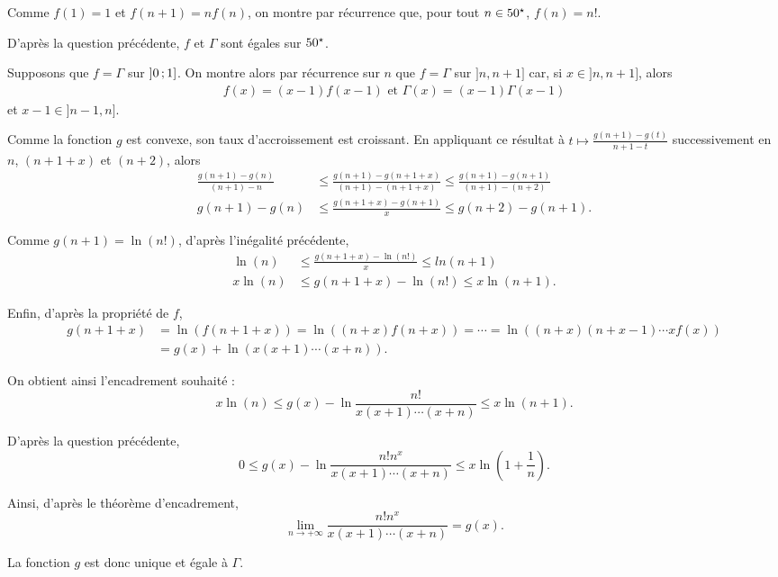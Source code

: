 \begin{solution}
\begin{reponses}
\item Comme $f(1) = 1$ et $f(n + 1) = n f(n)$, on montre par récurrence que, pour tout $n \in 50^\star$, $f(n) = n!$.

\item D'après la question précédente, $f$ et $\Gamma$ sont égales sur $50^\star$.

Supposons que $f = \Gamma$ sur $\left]0\,;1\right]$. On montre alors par récurrence sur $n$ que $f = \Gamma$ sur $]n, n + 1]$ car, si $x \in ]n, n + 1]$, alors
\begin{align*}
f(x) = (x - 1) f(x - 1)
\text{ et }
\Gamma(x) = (x - 1) \Gamma(x - 1)
\end{align*}
et $x - 1 \in ]n-1, n]$.

\item Comme la fonction $g$ est convexe, son taux d'accroissement est croissant. En appliquant ce résultat à $t \mapsto \frac{g(n + 1) - g(t)}{n + 1 - t}$ successivement en $n$, $(n + 1 + x)$ et $(n + 2)$, alors
\begin{align*}
\frac{g(n + 1) - g(n)}{(n + 1) - n}
&\leq \frac{g(n + 1) - g(n + 1 + x)}{(n + 1) - (n + 1 + x)}
\leq \frac{g(n + 1) - g(n + 1)}{(n + 1) - (n + 2)}\\
g(n + 1) - g(n) &\leq \frac{g(n + 1 + x) - g(n + 1)}{x} \leq g(n + 2) - g(n + 1).
\end{align*}

\item Comme $g(n + 1) = \ln(n!)$, d'après l'inégalité précédente,
\begin{align*}
\ln(n) &\leq \frac{g(n + 1 + x) - \ln(n!)}{x} \leq ln(n + 1)\\
x \ln(n) &\leq g(n + 1 + x) - \ln(n!) \leq x \ln(n + 1).
\end{align*}

Enfin, d'après la propriété de $f$,
\begin{align*}
g(n + 1 + x)
&= \ln\left(f(n + 1 + x)\right)
= \ln\left((n + x) f(n + x)\right)
= \cdots
= \ln\left((n + x) (n + x - 1) \cdots x f(x)\right)\\
&= g(x) + \ln\left(x (x + 1) \cdots (x + n)\right).
\end{align*}

On obtient ainsi l'encadrement souhaité :
\[
x \ln(n)
\leq g(x) - \ln\frac{n!}{x (x + 1) \cdots (x + n)} \leq x \ln(n + 1).
\]

\item D'après la question précédente,
\[
0 \leq g(x) - \ln \frac{n! n^x}{x (x + 1) \cdots (x + n)} \leq x \ln\left(1 + \frac{1}{n}\right).
\]

Ainsi, d'après le théorème d'encadrement,
\[
\lim_{n\to+\infty} \frac{n! n^x}{x (x + 1) \cdots (x + n)} = g(x).
\]

La fonction $g$ est donc unique et égale à $\Gamma$.
\end{reponses}
\end{solution}

